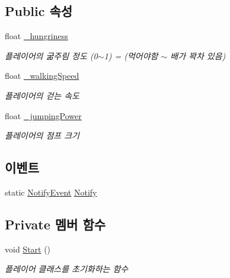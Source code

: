 \subsection*{Public 속성}
\begin{DoxyCompactItemize}
\item 
float \mbox{\hyperlink{class_player_controller_ab4fed78a016e8baca12e50bb3d7f034a}{\+\_\+hungriness}}
\begin{DoxyCompactList}\small\item\em 플레이어의 굶주림 정도 (0$\sim$1) = (먹어야함 $\sim$ 배가 꽉차 있음) \end{DoxyCompactList}\item 
float \mbox{\hyperlink{class_player_controller_a1ab6a7892eecf1a9fa7b1a49842a3dd2}{\+\_\+walking\+Speed}}
\begin{DoxyCompactList}\small\item\em 플레이어의 걷는 속도 \end{DoxyCompactList}\item 
float \mbox{\hyperlink{class_player_controller_ad5b01cf8e0c714d76cbd667d4fab7c25}{\+\_\+jumping\+Power}}
\begin{DoxyCompactList}\small\item\em 플레이어의 점프 크기 \end{DoxyCompactList}\end{DoxyCompactItemize}
\subsection*{이벤트}
\begin{DoxyCompactItemize}
\item 
static \mbox{\hyperlink{class_player_controller_a934c7f80b80276620cd60eaaeea7520e}{Notify\+Event}} \mbox{\hyperlink{class_player_controller_af13292e01756741118500035511fc88d}{Notify}}
\end{DoxyCompactItemize}
\subsection*{Private 멤버 함수}
\begin{DoxyCompactItemize}
\item 
void \mbox{\hyperlink{class_player_controller_ae1117d9c4da3193181cddad2c814e467}{Start}} ()
\begin{DoxyCompactList}\small\item\em 플레이어 클래스를 초기화하는 함수 \end{DoxyCompactList}\end{DoxyCompactItemize}


